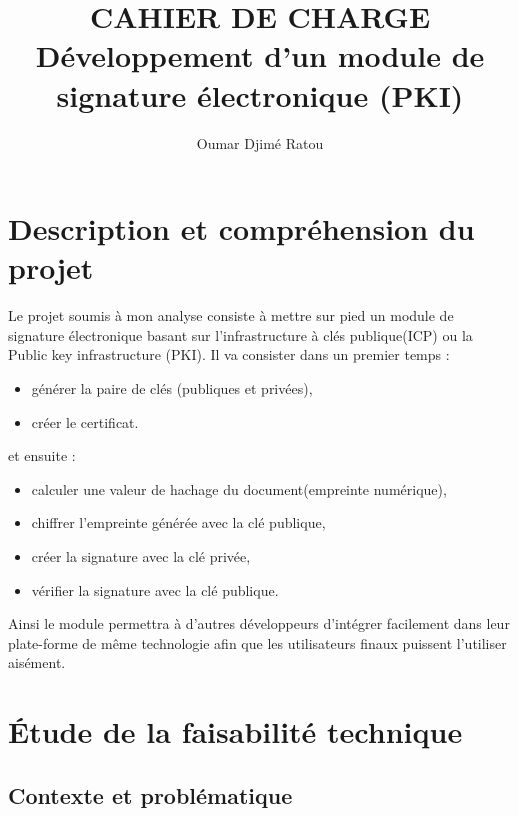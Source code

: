 \documentclass[12pt,a4paper]{article}
\begin{document}
\title{
	{\textbf{{\Huge CAHIER DE CHARGE}}}\\
	\vspace*{2cm}
	{Développement d'un module de signature électronique (PKI)}
}

\author{Oumar Djimé Ratou}

\maketitle


\newpage
\tableofcontents
\newpage


\section{Description et compréhension du projet}

	Le projet soumis à mon analyse consiste à mettre sur pied un module de signature électronique basant sur  l'infrastructure à clés publique(ICP) ou la Public key infrastructure (PKI). Il va consister  dans un premier temps :
	\begin{itemize}
		\item générer la paire de clés (publiques et privées),
		\item créer le certificat.
\end{itemize}		
	   et ensuite :
	\begin{itemize}
	\item calculer une valeur de hachage du document(empreinte numérique),
	\item chiffrer l'empreinte générée avec la clé publique,
	\item créer la signature avec la clé privée,
	\item vérifier la signature avec la clé publique.
\end{itemize}		   
	
	 Ainsi le module permettra à d'autres développeurs d'intégrer facilement dans leur plate-forme de même technologie afin que les utilisateurs finaux puissent l'utiliser aisément.

\section{Étude de la faisabilité technique}
	\subsection{Contexte et problématique} 
	
\end{document}
